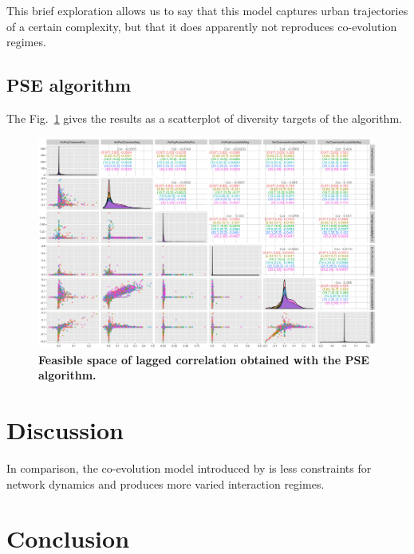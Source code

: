 This brief exploration allows us to say that this model captures urban trajectories of a certain complexity, but that it does apparently not reproduces co-evolution regimes.



\subsection{PSE algorithm}




The Fig.~\ref{fig:pse} gives the results as a scatterplot of diversity targets of the algorithm.


\begin{figure}
	\includegraphics[width=\textwidth]{figures/scatterplot_colornwThreshold.png}
	\caption{\textbf{Feasible space of lagged correlation obtained with the PSE algorithm.}\label{fig:pse}}
\end{figure}



\section{Discussion}


In comparison, the co-evolution model introduced by \cite{2018arXiv180409430R} is less constraints for network dynamics and produces more varied interaction regimes.




\section{Conclusion}


